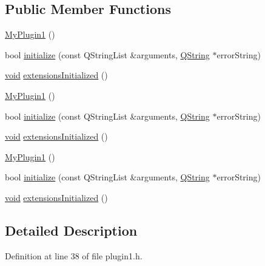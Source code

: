 \subsection*{Public Member Functions}
\begin{DoxyCompactItemize}
\item 
\hyperlink{class_plugin1_1_1_my_plugin1_aa669fad3fa65d610bb17197b34a6d8cf}{My\-Plugin1} ()
\item 
bool \hyperlink{class_plugin1_1_1_my_plugin1_abe68963937d1889611b4e3693e585db5}{initialize} (const Q\-String\-List \&arguments, \hyperlink{group___u_a_v_objects_plugin_gab9d252f49c333c94a72f97ce3105a32d}{Q\-String} $\ast$error\-String)
\item 
\hyperlink{group___u_a_v_objects_plugin_ga444cf2ff3f0ecbe028adce838d373f5c}{void} \hyperlink{class_plugin1_1_1_my_plugin1_ab68d9707ac743bacd4bf109e788e28ea}{extensions\-Initialized} ()
\item 
\hyperlink{class_plugin1_1_1_my_plugin1_ac6ef8b07297e70eaf096da48e0dba7f5}{My\-Plugin1} ()
\item 
bool \hyperlink{class_plugin1_1_1_my_plugin1_a4919abec6b960bd7548c4c912bece22c}{initialize} (const Q\-String\-List \&arguments, \hyperlink{group___u_a_v_objects_plugin_gab9d252f49c333c94a72f97ce3105a32d}{Q\-String} $\ast$error\-String)
\item 
\hyperlink{group___u_a_v_objects_plugin_ga444cf2ff3f0ecbe028adce838d373f5c}{void} \hyperlink{class_plugin1_1_1_my_plugin1_a363f7c72c9d3236f00808af931058527}{extensions\-Initialized} ()
\item 
\hyperlink{class_plugin1_1_1_my_plugin1_ac6ef8b07297e70eaf096da48e0dba7f5}{My\-Plugin1} ()
\item 
bool \hyperlink{class_plugin1_1_1_my_plugin1_a4919abec6b960bd7548c4c912bece22c}{initialize} (const Q\-String\-List \&arguments, \hyperlink{group___u_a_v_objects_plugin_gab9d252f49c333c94a72f97ce3105a32d}{Q\-String} $\ast$error\-String)
\item 
\hyperlink{group___u_a_v_objects_plugin_ga444cf2ff3f0ecbe028adce838d373f5c}{void} \hyperlink{class_plugin1_1_1_my_plugin1_a363f7c72c9d3236f00808af931058527}{extensions\-Initialized} ()
\end{DoxyCompactItemize}


\subsection{Detailed Description}


Definition at line 38 of file plugin1.\-h.



